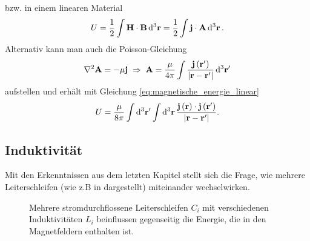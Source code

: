 bzw. in einem linearen Material
\begin{equation}
	\label{eq:magnetische_energie_linear}
	U=\frac{1}{2}\int \vec {H}\cdot \vec {B}\diffa[3]{\vec{r}}=\frac{1}{2}\int \vec {j}\cdot \vec {A}\diffa[3]{\vec{r}}.
\end{equation}
Alternativ kann man auch die Poisson-Gleichung
\begin{equation*}
	\nabla ^{2}\vec {A}=-\mu \vec {j}\implication \vec {A}=\frac{\mu }{4\pi }\int \frac{\vec {j}\left(\vec {r}'\right)}{\left| \vec {r}-\vec {r}'\right| }\diffa[3]{\vec{r}'}
\end{equation*}
aufstellen und erhält mit Gleichung \eqref{eq:magnetische_energie_linear}
\begin{equation*}
	U = \frac{\mu }{8\pi }\int \diffa[3]{\vec {r}'}\int \diffa[3]{\vec {r}}\frac{\vec {j}\left(\vec {r}\right)\cdot \vec {j}\left(\vec {r}'\right)}{\left| \vec {r}-\vec {r}'\right| }.
\end{equation*}

\subsection{Induktivität}

Mit den Erkenntnissen aus dem letzten Kapitel stellt sich die Frage, wie mehrere Leiterschleifen (wie z.B in  dargestellt) miteinander wechselwirken.

\begin{figure}[ht]
	\centering
	\tfigTwoInductors
	\caption{Mehrere stromdurchflossene Leiterschleifen $C_i$ mit verschiedenen Induktivitäten $L_i$ beinflussen gegenseitig die Energie, die in den Magnetfeldern enthalten ist. }
	\label{fig:TwoInductors}
\end{figure}


